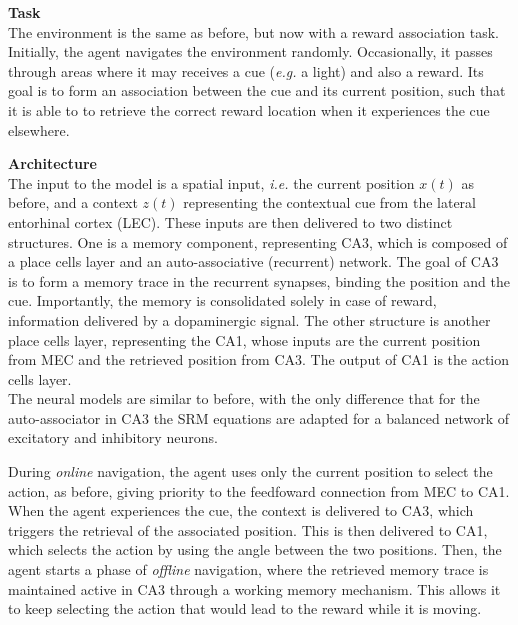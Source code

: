 \hfill \break
\noindent\textbf{Task} \\
\noindent The environment is the same as before, but now with a reward association task. Initially, the agent navigates the environment randomly. Occasionally, it passes through areas where it may receives a cue (\textit{e.g.} a light) and also a reward. Its goal is to form an association between
the cue and its current position, such that it is able to to retrieve the correct reward location when it experiences the cue elsewhere. 

\hfill \break
\noindent\textbf{Architecture}\\
\noindent The input to the model is a spatial input, \textit{i.e.} the current position $x(t)$ as before, and a context $z(t)$ representing the contextual cue from the lateral entorhinal cortex (LEC). These inputs are then delivered to two distinct structures. One is a memory component, representing
CA3, which is composed of a place cells layer and an auto-associative (recurrent) network. The goal of CA3 is to form a memory trace in the recurrent synapses, binding the position and the cue. Importantly, the memory is consolidated solely in case of reward, information delivered by a dopaminergic
signal. The other structure is another place cells layer, representing the CA1, whose inputs are the current position from MEC and the retrieved position from CA3. The output of CA1 is the action cells layer. \\
The neural models are similar to before, with the only difference that for the auto-associator in CA3 the SRM equations are adapted for a balanced network of excitatory and inhibitory neurons. 

\hfill \break 
During \textit{online} navigation, the agent uses only the current position to select the action, as before, giving priority to the feedfoward connection from MEC to CA1. When the agent experiences the cue, the context is delivered to CA3, which triggers the retrieval of the associated position. This is
then delivered to CA1, which selects the action by using the angle between the two positions. Then, the agent starts a phase of \textit{offline} navigation, where the retrieved memory trace is maintained active in CA3 through a working memory mechanism. This allows it to keep selecting the action
that would lead to the reward while it is moving. 


